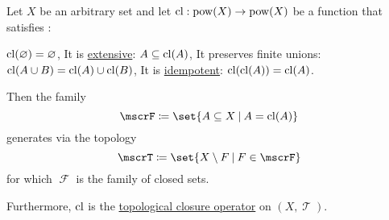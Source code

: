 \begin{proposition}\label{thm:topology_from_closure_operator}
  Let \( X \) be an arbitrary set and let \( \operatorname{cl}: \operatorname{pow}(X) \to \operatorname{pow}(X) \) be a function that satisfies :
  \begin{thmenum}
     \( \operatorname{cl}(\varnothing) = \varnothing \),
     It is \hyperref[def:extensive_function]{extensive}: \( A \subseteq \operatorname{cl}(A) \),
     It preserves finite unions: \( \operatorname{cl}(A \cup B) = \operatorname{cl}(A) \cup \operatorname{cl}(B) \),
     It is \hyperref[def:binary_operation/idempotent]{idempotent}: \( \operatorname{cl}(\operatorname{cl}(A)) = \operatorname{cl}(A) \).
  \end{thmenum}

  Then the family
  \begin{equation*}
    \mscrF \coloneqq \set{ A \subseteq X \given A = \cl(A) }
  \end{equation*}
  generates via  the topology
  \begin{equation*}
    \mscrT \coloneqq \set{ X \setminus F \given F \in \mscrF }
  \end{equation*}
  for which \( \mscrF \) is the family of closed sets.

  Furthermore, \( \operatorname{cl} \) is the \hyperref[def:topological_closure_operator]{topological closure operator} on \( (X, \mscrT) \).
\end{proposition}
